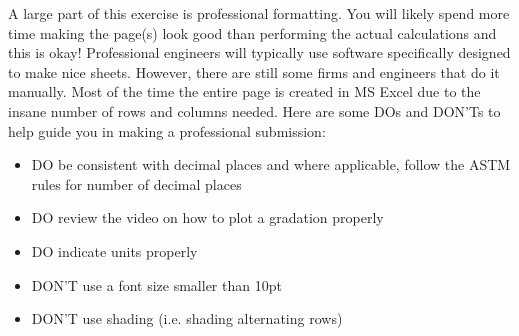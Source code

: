 \documentclass[12pt]{article}
\begin{document}
A large part of this exercise is professional formatting. You will likely spend more time making the page(s) look good than performing the actual calculations and this is okay! Professional engineers will typically use software specifically designed to make nice sheets. However, there are still some firms and engineers that do it manually. Most of the time the entire page is created in MS Excel due to the insane number of rows and columns needed. Here are some DOs and DON'Ts to help guide you in making a professional submission:

\begin{itemize}
    \item DO be consistent with decimal places and where applicable, follow the ASTM rules for number of decimal places
    \item DO review the video on how to plot a gradation properly
    \item DO indicate units properly
    \item DON'T use a font size smaller than 10pt
    \item DON'T use shading (i.e. shading alternating rows)
\end{itemize}

%
%

\pagebreak
\end{document}
